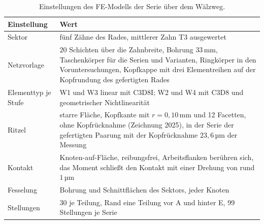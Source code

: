 \begin{table}[htbp]
	\caption{Einstellungen des FE-Modells der Serie über dem Wälzweg.}
	\label{tab:anhang_fe_einstellungen}
	\centering
	\footnotesize
	\begin{tabular}{L{5.0cm}L{10.0cm}}
		Einstellung         & Wert                                                                                                                                                                                                                    \\
		\hline
		Sektor              & fünf Zähne des Rades, mittlerer Zahn T3 ausgewertet                                                                                                                                                                     \\
		\hline
		Netzvorlage         & $20$ Schichten über die Zahnbreite, Bohrung $33$\,mm, Taschenkörper für die Serien und Varianten, Ringkörper in den Voruntersuchungen, Kopfkappe mit drei Elementreihen auf der Kopfrundung des gefertigten Rades \\
		\hline
		Elementtyp je Stufe & W1 und W3 linear mit C3D8I; W2 und W4 mit C3D8 und geometrischer Nichtlinearität                                                                                                                                        \\
		\hline
		Ritzel              & starre Fläche, Kopfkante mit $r = 0{,}10$\,mm und 12 Facetten, ohne Kopfrücknahme (Zeichnung 2025), in der Serie der gefertigten Paarung mit der Kopfrücknahme $23{,}6$\,µm der Messung                           \\
		\hline
		Kontakt             & Knoten-auf-Fläche, reibungsfrei, Arbeitsflanken berühren sich, das Moment schließt den Kontakt mit einer Drehung von rund $1$\,µm                                                                                       \\
		\hline
		Fesselung           & Bohrung und Schnittflächen des Sektors, jeder Knoten                                                                                                                                                                    \\
		\hline
		Stellungen          & $30$ je Teilung, Rand eine Teilung vor A und hinter E, 99 Stellungen je Serie                                                                                                                                           \\

\end{tabular}
\end{table}
